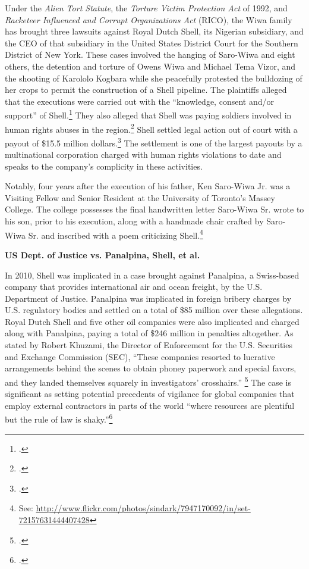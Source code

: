 Under the \emph{Alien Tort Statute}, the \emph{Torture Victim Protection Act} of 1992, and \emph{Racketeer Influenced and Corrupt Organizations Act} (RICO), the Wiwa family has brought three lawsuits against Royal Dutch Shell, its Nigerian subsidiary, and the CEO of that subsidiary in the United States District Court for the Southern District of New York.
These cases involved the hanging of Saro-Wiwa and eight others, the detention and torture of Owens Wiwa and Michael Tema Vizor, and the shooting of Karololo Kogbara while she peacefully protested the bulldozing of her crops to permit the construction of a Shell pipeline.
The plaintiffs alleged that the executions were carried out with the ``knowledge, consent and/or support'' of Shell.\footcite{ShellTrialDelayed}
They also alleged that Shell was paying soldiers involved in human rights abuses in the region.\footcite{Shell15Million}
Shell settled legal action out of court with a payout of \$15.5 million dollars.\footcite{Shell15Million}
The settlement is one of the largest payouts by a multinational corporation charged with human rights violations to date and speaks to the company's complicity in these activities.



Notably, four years after the execution of his father, Ken Saro-Wiwa Jr. was a Visiting Fellow and Senior Resident at the University of Toronto's Massey College.
The college possesses the final handwritten letter Saro-Wiwa Sr. wrote to his son, prior to his execution, along with a handmade chair crafted by Saro-Wiwa Sr. and inscribed with a poem criticizing Shell.\footnote{See: \url{http://www.flickr.com/photos/sindark/7947170092/in/set-72157631444407428}}



\textbf{US Dept. of Justice vs. Panalpina, Shell, et al.}



In 2010, Shell was implicated in a case brought against Panalpina, a Swiss-based company that provides international air and ocean freight, by the U.S. Department of Justice. 
Panalpina was implicated in foreign bribery charges by U.S. regulatory bodies and settled on a total of \$85 million over these allegations. 
Royal Dutch Shell and five other oil companies were also implicated and charged along with Panalpina, paying a total of \$246 million in penalties altogether. 
As stated by Robert Khuzami, the Director of Enforcement for the U.S. Securities and Exchange Commission (SEC), ``These companies resorted to lucrative arrangements behind the scenes to obtain phoney paperwork and special favors, and they landed themselves squarely in investigators’ crosshairs.'' \footcite[][p. 119]{KochanGoodYear_2011} 
The case is significant as setting potential precedents of vigilance for global companies that employ external contractors in parts of the world ``where resources are plentiful but the rule of law is shaky.''\footcite[][]{Bribery_2010}



